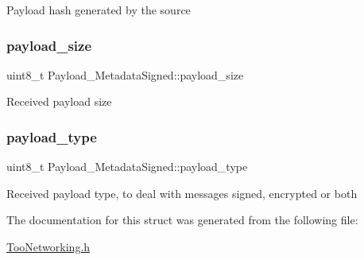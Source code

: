 Payload hash generated by the source \mbox{\label{structPayload__MetadataSigned_acc293d1cef4a0c121149eb68a834b4ea}} 
\subsubsection{\texorpdfstring{payload\+\_\+size}{payload\_size}}
{\footnotesize\ttfamily uint8\+\_\+t Payload\+\_\+\+Metadata\+Signed\+::payload\+\_\+size}

Received payload size \mbox{\label{structPayload__MetadataSigned_a05467542863d8bfb345c11f8ccefd852}} 
\subsubsection{\texorpdfstring{payload\+\_\+type}{payload\_type}}
{\footnotesize\ttfamily uint8\+\_\+t Payload\+\_\+\+Metadata\+Signed\+::payload\+\_\+type}

Received payload type, to deal with messages signed, encrypted or both 

The documentation for this struct was generated from the following file\+:\begin{DoxyCompactItemize}
\item 
\hyperlink{TooNetworking_8h}{Too\+Networking.\+h}\end{DoxyCompactItemize}
